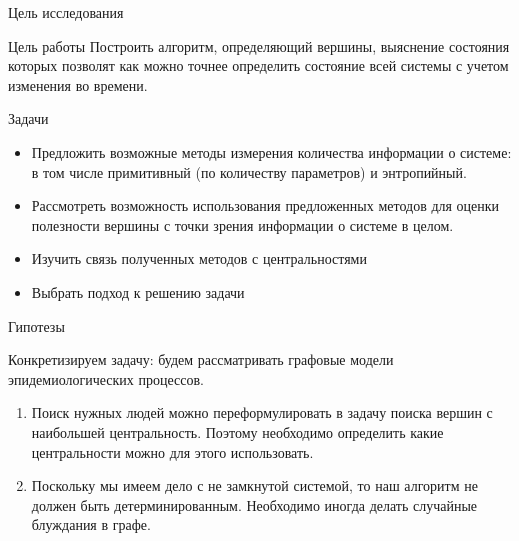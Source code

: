 \documentclass[hyperref={unicode}]{beamer}
\begin{document}
\begin{frame}{Цель исследования}

\medskip

\begin{block}{Цель работы}
Построить алгоритм, определяющий вершины, выяснение состояния которых позволят как можно точнее определить состояние всей системы с учетом изменения во времени.
\end{block}

\begin{block}{Задачи}

\begin{itemize}
    \item Предложить возможные методы измерения количества информации о системе: в том числе примитивный (по количеству параметров) и энтропийный.
    \item Рассмотреть возможность использования предложенных методов для оценки полезности вершины с точки зрения информации о системе в целом.
    \item Изучить связь полученных методов с центральностями
    \item Выбрать подход к решению задачи
\end{itemize}
\end{block}

\end{frame}

\begin{frame}{Гипотезы}

Конкретизируем задачу: будем рассматривать графовые модели эпидемиологических процессов.

\bigskip

\begin{enumerate}
    \item Поиск нужных людей можно переформулировать в задачу поиска вершин с наибольшей центральность. Поэтому необходимо определить какие центральности можно для этого использовать.
    
    \medskip
    
    \item Поскольку мы имеем дело с не замкнутой системой, то наш алгоритм не должен быть детерминированным. Необходимо иногда делать случайные блуждания в графе.
    
\end{enumerate}
\end{frame}
\end{document}
